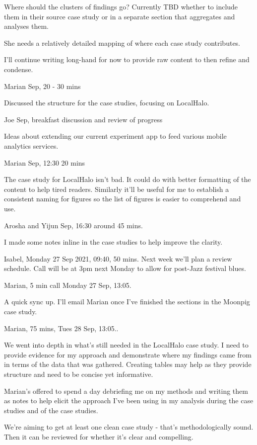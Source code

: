 Where should the clusters of findings go?
Currently TBD whether to include them in their source case study or in a separate section that aggregates and analyses them.

She needs a relatively detailed mapping of where each case study contributes.

I'll continue writing long-hand for now to provide raw content to then refine and condense.

\dotfill
Marian  Sep, 20 - 30 mins

Discussed the structure for the case studies, focusing on LocalHalo.

\dotfill
Joe  Sep, breakfast discussion and review of progress

Ideas about extending our current experiment app to feed various mobile analytics services. 

\dotfill
Marian  Sep, 12:30 20 mins

The case study for LocalHalo isn't bad. It could do with better formatting of the content to help tired readers. Similarly it'll be useful for me to establish a consistent naming for figures so the list of figures is easier to comprehend and use.

\dotfill
Arosha and Yijun  Sep, 16:30 around 45 mins.

I made some notes inline in the case studies to help improve the clarity.

\dotfill
Isabel, Monday 27 Sep 2021, 09:40, 50 mins.
Next week we'll plan a review schedule. Call will be at 3pm next Monday to allow for post-Jazz festival blues.

\dotfill
Marian, 5 min call Monday 27 Sep, 13:05.

A quick sync up. I'll email Marian once I've finished the sections in the Moonpig case study.

\dotfill
Marian, 75 mins, Tues 28 Sep, 13:05..

We went into depth in what's still needed in the LocalHalo case study. I need to provide evidence for my approach and demonstrate where my findings came from in terms of the data that was gathered. Creating tables may help as they provide structure and need to be concise yet informative.

Marian's offered to spend a day debriefing me on my methods and writing them as notes to help elicit the approach I've been using in my analysis during the case studies and of the case studies.

We're aiming to get at least one clean case study - that's methodologically sound. Then it can be reviewed for whether it's clear and compelling.

